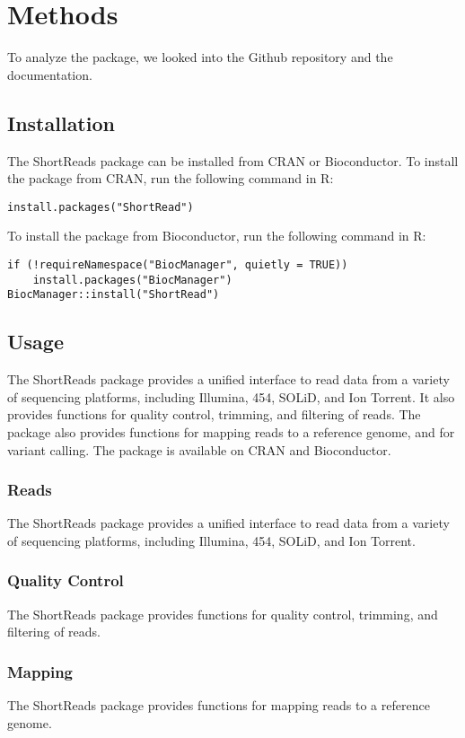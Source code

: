\documentclass[12pt]{article}
\begin{document}
\section{Methods}
To analyze the package, we looked into the Github repository\cite{shortreadsgit} and the documentation\cite{shortreadsdoc}.


\subsection{Installation}
The ShortReads package can be installed from CRAN or Bioconductor. To install the package from CRAN, run the following command in R:
\begin{verbatim}
install.packages("ShortRead")
\end{verbatim}
To install the package from Bioconductor, run the following command in R:
\begin{verbatim}
if (!requireNamespace("BiocManager", quietly = TRUE))
    install.packages("BiocManager")
BiocManager::install("ShortRead")
\end{verbatim}

\subsection{Usage}
The ShortReads package provides a unified interface to read data from a variety of sequencing platforms,
including Illumina, 454, SOLiD, and Ion Torrent.
It also provides functions for quality control, trimming, and filtering of reads.
The package also provides functions for mapping reads to a reference genome, and for variant calling.
The package is available on CRAN and Bioconductor.

\subsubsection{Reads}
The ShortReads package provides a unified interface to read data from a variety of sequencing platforms, including Illumina, 454, SOLiD, and Ion Torrent.

\subsubsection{Quality Control}
The ShortReads package provides functions for quality control, trimming, and filtering of reads.

\subsubsection{Mapping}
The ShortReads package provides functions for mapping reads to a reference genome.
\end{document}
